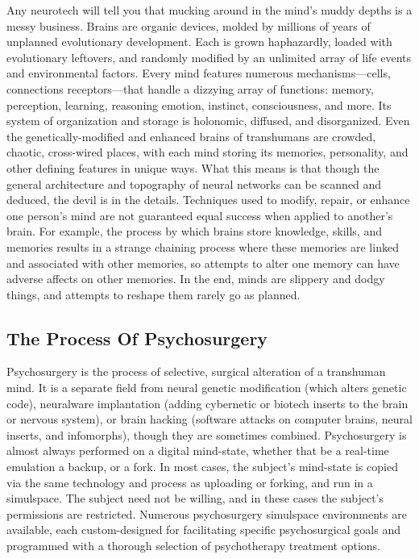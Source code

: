 Any neurotech will tell you that mucking around 
in the mind's muddy depths is a messy business. 
Brains are organic devices, molded by millions of 
years of unplanned evolutionary development. Each 
is grown haphazardly, loaded with evolutionary 
leftovers, and randomly modified by an unlimited 
array of life events and environmental factors. Every 
mind features numerous mechanisms—cells, connections
receptors—that handle a dizzying array
of functions: memory, perception, learning, reasoning
emotion, instinct, consciousness, and more. Its
system of organization and storage is holonomic, 
diffused, and disorganized. Even the genetically-modified
and enhanced brains of transhumans are
crowded, chaotic, cross-wired places, with each 
mind storing its memories, personality, and other 
defining features in unique ways.
What this means is that though the general architecture
and topography of neural networks can
be scanned and deduced, the devil is in the details. 
Techniques used to modify, repair, or enhance one 
person's mind are not guaranteed equal success 
when applied to another's brain. For example, the 
process by which brains store knowledge, skills, and 
memories results in a strange chaining process where 
these memories are linked and associated with other 
memories, so attempts to alter one memory can 
have adverse affects on other memories. In the end, 
minds are slippery and dodgy things, and attempts 
to reshape them rarely go as planned.

\subsection{The Process Of Psychosurgery}

Psychosurgery is the process of selective, surgical alteration
of a transhuman mind. It is a separate field from
neural genetic modification (which alters genetic code), 
neuralware implantation (adding cybernetic or biotech 
inserts to the brain or nervous system), or brain hacking 
(software attacks on computer brains, neural inserts, and 
infomorphs), though they are sometimes combined.
Psychosurgery is almost always performed on a 
digital mind-state, whether that be a real-time emulation
a backup, or a fork. In most cases, the subject's
mind-state is copied via the same technology and process
as uploading or forking, and run in a simulspace.
The subject need not be willing, and in these cases 
the subject's permissions are restricted. Numerous 
psychosurgery simulspace environments are available, 
each custom-designed for facilitating specific psychosurgical
goals and programmed with a thorough
selection of psychotherapy treatment options.

